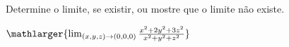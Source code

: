 Determine o limite, se existir, ou mostre que o limite não existe.

$\mathlarger{\lim_{(x,y,z)\rightarrow(0,0,0)} \frac{x^2+2y^2+3z^2}{x^2+y^2+z^2}}$
